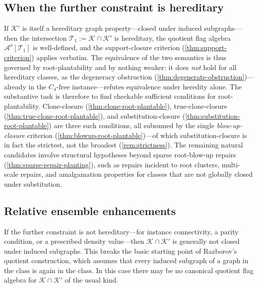 \documentclass[11pt]{article}
\theoremstyle{definition}
\newcommand{\A}{\mathcal{A}}
\newcommand{\K}{\mathcal{K}}
\newcommand{\T}{\mathcal{T}}
\begin{document}
\subsection{When the further constraint is hereditary}

If $\K'$ is itself a hereditary graph property---closed under induced subgraphs---then the
intersection $\T_1:=\K\cap\K'$ is hereditary, the quotient flag algebra $\A^\sigma[\T_1]$
is well-defined, and the support-closure criterion (\cref{thm:support-criterion}) applies
verbatim.  The equivalence of the two semantics is thus governed by root-plantability and
by nothing weaker: it does \emph{not} hold for all hereditary classes, as the degeneracy
obstruction (\cref{thm:degenerate-obstruction})---already in the $C_4$-free
instance---refutes equivalence under heredity alone.  The substantive task is therefore
to find checkable sufficient conditions for root-plantability.  Clone-closure
(\cref{thm:clone-root-plantable}), true-clone-closure (\cref{thm:true-clone-root-plantable}),
and substitution-closure (\cref{thm:substitution-root-plantable}) are three such
conditions, all subsumed by the single \emph{blow-up-closure} criterion
(\cref{thm:blowup-root-plantable})---of which substitution-closure is in fact the strictest,
not the broadest (\cref{rem:strictness}).  The remaining natural candidates involve
structural hypotheses beyond sparse root-blow-up repairs
(\cref{thm:sparse-repair-planting}), such as repairs incident to root clusters,
multi-scale repairs, and amalgamation properties for classes that are not globally
closed under substitution.

\subsection{Relative ensemble enhancements}

If the further constraint is not hereditary---for instance connectivity, a parity
condition, or a prescribed density value---then $\K\cap\K'$ is generally not closed under
induced subgraphs.  This breaks the basic starting point of Razborov's quotient
construction, which assumes that every induced subgraph of a graph in the class is again
in the class.  In this case there may be no canonical quotient flag algebra for
$\K\cap\K'$ of the usual kind.
\end{document}
